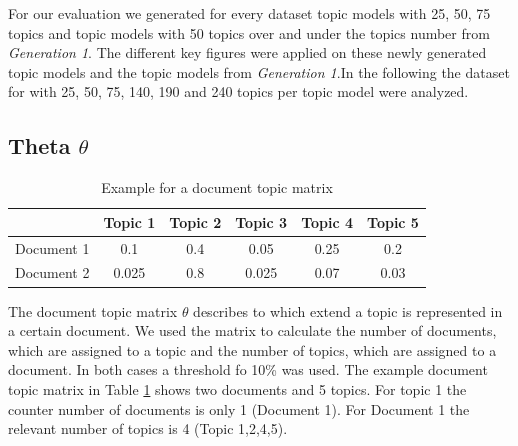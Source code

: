 For our evaluation we generated for every dataset topic models with 25, 50, 75 topics and topic models with 50 topics over and under the topics number from \textit{Generation 1}. The different key figures were applied on these newly generated topic models and the topic models from \textit{Generation 1}.In the following the dataset for  with 25, 50, 75, 140, 190 and 240 topics per topic model were analyzed.

\subsection{Theta $\theta$}
\begin{table}[h]
	\centering
	\begin{tabular}{c|ccccc}
		&Topic 1&Topic 2&Topic 3&Topic 4&Topic 5\\
		\hline
		Document 1&0.1 & 0.4 & 0.05 & 0.25 & 0.2  \\
		Document 2&0.025&0.8 & 0.025 & 0.07 & 0.03\\
	\end{tabular}
	\caption[Document topic matrix]{Example for a document topic matrix}
	\label{doc_topic}
\end{table}
The document topic matrix $\theta$ describes to which extend a topic is represented in a certain document.
We used the matrix to calculate the number of documents, which are assigned to a topic and the number of topics, which are assigned to a document. In both cases a threshold fo 10\% was used. The example document topic matrix in Table \ref{doc_topic} shows two documents and 5 topics. For topic 1 the counter number of documents is only 1 (Document 1). For Document 1 the relevant number of topics is 4 (Topic 1,2,4,5). 

